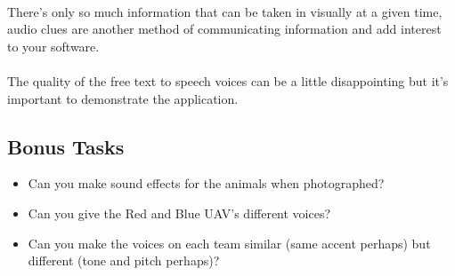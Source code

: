 \documentclass[11pt]{book}
\begin{document}
\paragraph{} There's only so much information that can be taken in visually at a given time, audio clues are another method of communicating information and add interest to your software.

\paragraph{} The quality of the free text to speech voices can be a little disappointing but it's important to demonstrate the application.

\subsection{Bonus Tasks}

\begin{itemize}
\item Can you make sound effects for the animals when photographed?
\item Can you give the Red and Blue UAV's different voices?
\item Can you make the voices on each team similar (same accent perhaps) but different (tone and pitch perhaps)?
\end{itemize}

\clearpage
\end{document}
